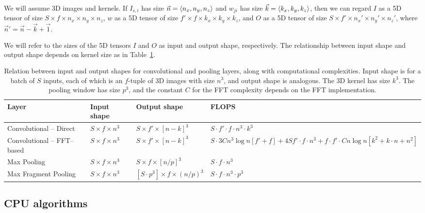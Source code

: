\documentclass[conference]{./IEEEtran}
\DeclarePairedDelimiter{\angled}{\langle}{\rangle}
\begin{document}
  We will assume 3D images and kernels.  If $I_{s,i}$ has size
  $\vec{n} = \angled{n_x, n_y, n_z}$ and $w_{ji}$ has size $\vec{k} =
  \angled{k_x,k_y,k_z}$, then we can regard $I$ as a 5D tensor of size
  $S \times f \times n_x \times n_y \times n_z$, $w$ as a 5D tensor of
  size $f' \times f \times k_x \times k_y \times k_z$, and $O$ as a 5D
  tensor of size $S \times f' \times n_x' \times n_y' \times n_z'$,
  where $\vec{n}' = \vec{n} - \vec{k} + \vec{1}$.

  We will refer to the sizes of the 5D tensors $I$ and $O$ as input
  and output shape, respectively.  The relationship between input
  shape and output shape depends on kernel size as in
  Table~\ref{table:layers_complexity}.

  \begin{table}[t]
    {\footnotesize
    \centering
    \begin{tabular}{l|lll}
      \toprule
      Layer   & Input shape    & Output shape     & FLOPS \\
      \midrule
      Convolutional -- Direct &
      $S \times f \times n^3$ &
      $S \times f' \times [n-k]^3$ &
      $S \cdot f' \cdot f \cdot n^3 \cdot k^3$ \\
      Convolutional -- FFT--based &
      $S \times f \times n^3$ &
      $S \times f' \times [n-k]^3$ &
      $S \cdot 3Cn^3 \log n[f' + f] + 4Sf' \cdot f \cdot n^3 + f \cdot f' \cdot Cn \log n[k^2 + k \cdot n + n^2]$ \\
      Max Pooling &
      $S \times f \times n^3$ &
      $S \times f \times [n/p]^3$ &
      $S \cdot f \cdot n^3$ \\
      Max Fragment Pooling &
      $S \times f \times n^3$ &
      $[S \cdot p^3] \times f \times (n/p)^3$ &
      $S \cdot f \cdot n^3 \cdot p^3$ \\
      \bottomrule
    \end{tabular}
    \caption{Relation between input and output shapes for
      convolutional and pooling layers, along with computational
      complexities. Input shape is for a batch of $S$ inputs, each of
      which is an $f$-tuple of 3D images with size $n^3$, and output
      shape is analogous. The 3D kernel has size $k^3$. The pooling
      window has size $p^3$, and the constant $C$ for the FFT
      complexity depends on the FFT implementation.}
    \label{table:layers_complexity}
    }
  \end{table}


\subsection{CPU algorithms}
\end{document}
